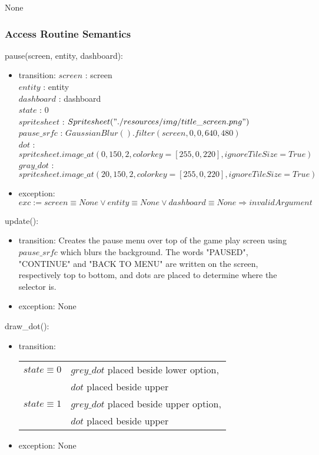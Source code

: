 \documentclass[12pt]{article}
\begin{document}
None

\subsubsection* {Access Routine Semantics}

\noindent pause(screen, entity, dashboard):
\begin{itemize}
    \item transition: 
    $screen$ : screen \\
    $entity$ : entity \\
    $dashboard$ : dashboard\\
    $state$ : 0 \\
    $spritesheet$ : $Spritesheet("./resources/img/title\_screen.png")$ \\
    $pause\_srfc$ : $GaussianBlur().filter(screen, 0, 0, 640, 480)$ \\
    $dot$ : $spritesheet.image\_at(0, 150, 2, colorkey=[255, 0, 220], ignoreTileSize=True)$ \\
    $gray\_dot$ : $spritesheet.image\_at(20, 150, 2, colorkey=[255, 0, 220], ignoreTileSize=True)$ \\
    
    \item exception: $exc := screen \equiv None \lor entity \equiv None \lor dashboard \equiv None \Rightarrow invalidArgument$
\end{itemize}

\noindent update():
\begin{itemize}
    \item transition: Creates the pause menu over top of the game play screen using $pause\_srfc$ which blurs the background. The words "PAUSED", "CONTINUE" and "BACK TO MENU" are written on the screen, respectively top to bottom, and dots are placed to determine where the selector is. 
    
    \item exception: None
\end{itemize}

\noindent draw\_dot():
\begin{itemize}
    \item transition:
    
    \begin{tabular}{|l|l|}
    \hline
    $state \equiv 0$ & $grey\_dot$ placed beside lower option, \\
     & $dot$ placed beside upper \\
    \hline
    $state \equiv 1$ \equiv 60 & $grey\_dot$ placed beside upper option, \\
     & $dot$ placed beside upper \\
    \hline
    \end{tabular}
    
    \item exception: None
\end{itemize}
\end{document}
